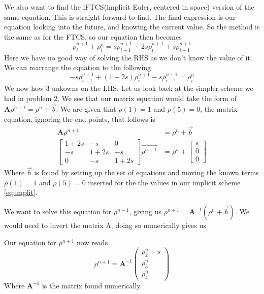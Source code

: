\documentclass[10pt, a4paper]{amsart}
\begin{document}
We also want to find the iFTCS(implicit Euler, centered in space) version of the same equation. This is straight forward to find. The final expression is our equation looking into the future, and knowing the current value. So the method is the same as for the FTCS, so our equation then becomes 
\begin{equation}
\rho^{n+1}_i + \rho^{n}_i= s\rho^{n+1}_{i+1} -2s\rho^{n+1}_{i} + s\rho^{n+1}_{i-1} 
\end{equation}
Here we have no good way of solving the RHS as we don't know the value of it. We can rearrange the equation to the following 
\begin{equation}
-s\rho^{n+1}_{i+1} +(1+2s)\rho^{n+1}_{i} - s\rho^{n+1}_{i-1}  = \rho^n_i\label{eq:implit}
\end{equation}
We now how 3 unkowns on the LHS. Let us look back at the simpler scheme we had in problem 2. We see that our matrix equation would take the form of $\mathbf{A}\rho^{n+1} = \rho^n + \vec{b}$. We are given that $\rho(1) = 1$ and $\rho(5) = 0$, the matrix equation, ignoring the end points, that follows is 
\begin{equation}
\begin{split}
\mathbf{A}\rho^{n+1} &= \rho^n + \vec{b}\\
\begin{bmatrix}
1+2s & -s & 0\\
-s & 1 +2s & -s\\
0 & -s & 1+2s
\end{bmatrix}
\vec{\rho^{n+1}} &= \rho^n + 
\begin{bmatrix}
s\\
0\\
0
\end{bmatrix}
\end{split}
\end{equation}
Where $\vec{b}$ is found by setting up the set of equations and moving the known terms $\rho(1) = 1$ and $\rho(5) = 0$ inserted for the the values in our implicit scheme \ref{eq:implit}. 

We want to solve this equation for $\rho^{n+1}$, giving us $\rho^{n+1} = \mathbf{A}^{-1}(\rho^n+\vec{b})$. We would need to invert the matrix A, doing so numerically gives us


Our equation for $\rho^{n+1}$ now reads 
\begin{equation}
\rho^{n+1} = \mathbf{A}^{-1}
\begin{pmatrix}
\rho^n_2 + s\\
\rho^n_3\\
\rho^n_4 
\end{pmatrix}
\end{equation}
Where $\mathbf{A}^{-1}$ is the matrix found numerically. 
\end{document}
